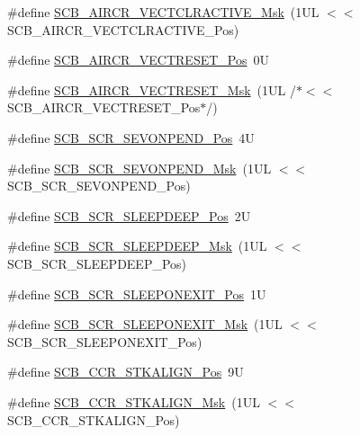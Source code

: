 \begin{DoxyCompactItemize}
\#define \hyperlink{group___c_m_s_i_s___s_c_b_ga212c5ab1c1c82c807d30d2307aa8d218}{S\-C\-B\-\_\-\-A\-I\-R\-C\-R\-\_\-\-V\-E\-C\-T\-C\-L\-R\-A\-C\-T\-I\-V\-E\-\_\-\-Msk}~(1\-U\-L $<$$<$ S\-C\-B\-\_\-\-A\-I\-R\-C\-R\-\_\-\-V\-E\-C\-T\-C\-L\-R\-A\-C\-T\-I\-V\-E\-\_\-\-Pos)
\item 
\#define \hyperlink{group___c_m_s_i_s___s_c_b_ga0d483d9569cd9d1b46ec0d171b1f18d8}{S\-C\-B\-\_\-\-A\-I\-R\-C\-R\-\_\-\-V\-E\-C\-T\-R\-E\-S\-E\-T\-\_\-\-Pos}~0\-U
\item 
\#define \hyperlink{group___c_m_s_i_s___s_c_b_ga3006e31968bb9725e7b4ee0784d99f7f}{S\-C\-B\-\_\-\-A\-I\-R\-C\-R\-\_\-\-V\-E\-C\-T\-R\-E\-S\-E\-T\-\_\-\-Msk}~(1\-U\-L /$\ast$$<$$<$ S\-C\-B\-\_\-\-A\-I\-R\-C\-R\-\_\-\-V\-E\-C\-T\-R\-E\-S\-E\-T\-\_\-\-Pos$\ast$/)
\item 
\#define \hyperlink{group___c_m_s_i_s___s_c_b_ga3bddcec40aeaf3d3a998446100fa0e44}{S\-C\-B\-\_\-\-S\-C\-R\-\_\-\-S\-E\-V\-O\-N\-P\-E\-N\-D\-\_\-\-Pos}~4\-U
\item 
\#define \hyperlink{group___c_m_s_i_s___s_c_b_gafb98656644a14342e467505f69a997c9}{S\-C\-B\-\_\-\-S\-C\-R\-\_\-\-S\-E\-V\-O\-N\-P\-E\-N\-D\-\_\-\-Msk}~(1\-U\-L $<$$<$ S\-C\-B\-\_\-\-S\-C\-R\-\_\-\-S\-E\-V\-O\-N\-P\-E\-N\-D\-\_\-\-Pos)
\item 
\#define \hyperlink{group___c_m_s_i_s___s_c_b_gab304f6258ec03bd9a6e7a360515c3cfe}{S\-C\-B\-\_\-\-S\-C\-R\-\_\-\-S\-L\-E\-E\-P\-D\-E\-E\-P\-\_\-\-Pos}~2\-U
\item 
\#define \hyperlink{group___c_m_s_i_s___s_c_b_ga77c06a69c63f4b3f6ec1032e911e18e7}{S\-C\-B\-\_\-\-S\-C\-R\-\_\-\-S\-L\-E\-E\-P\-D\-E\-E\-P\-\_\-\-Msk}~(1\-U\-L $<$$<$ S\-C\-B\-\_\-\-S\-C\-R\-\_\-\-S\-L\-E\-E\-P\-D\-E\-E\-P\-\_\-\-Pos)
\item 
\#define \hyperlink{group___c_m_s_i_s___s_c_b_ga3680a15114d7fdc1e25043b881308fe9}{S\-C\-B\-\_\-\-S\-C\-R\-\_\-\-S\-L\-E\-E\-P\-O\-N\-E\-X\-I\-T\-\_\-\-Pos}~1\-U
\item 
\#define \hyperlink{group___c_m_s_i_s___s_c_b_ga50a243e317b9a70781b02758d45b05ee}{S\-C\-B\-\_\-\-S\-C\-R\-\_\-\-S\-L\-E\-E\-P\-O\-N\-E\-X\-I\-T\-\_\-\-Msk}~(1\-U\-L $<$$<$ S\-C\-B\-\_\-\-S\-C\-R\-\_\-\-S\-L\-E\-E\-P\-O\-N\-E\-X\-I\-T\-\_\-\-Pos)
\item 
\#define \hyperlink{group___c_m_s_i_s___s_c_b_gac2d20a250960a432cc74da59d20e2f86}{S\-C\-B\-\_\-\-C\-C\-R\-\_\-\-S\-T\-K\-A\-L\-I\-G\-N\-\_\-\-Pos}~9\-U
\item 
\#define \hyperlink{group___c_m_s_i_s___s_c_b_ga33cf22d3d46af158a03aad25ddea1bcb}{S\-C\-B\-\_\-\-C\-C\-R\-\_\-\-S\-T\-K\-A\-L\-I\-G\-N\-\_\-\-Msk}~(1\-U\-L $<$$<$ S\-C\-B\-\_\-\-C\-C\-R\-\_\-\-S\-T\-K\-A\-L\-I\-G\-N\-\_\-\-Pos)
$$
\end{DoxyCompactItemize}
